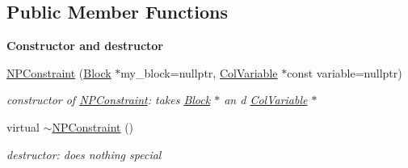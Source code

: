 \subsection*{Public Member Functions}
\begin{Indent}\textbf{ Constructor and destructor}\par
\begin{DoxyCompactItemize}
\item 
\mbox{\hyperlink{class_s_m_spp__di__unipi__it_1_1_n_p_constraint_ad3dee97dc71ec7fb7eab2dcf21b21023}{N\+P\+Constraint}} (\mbox{\hyperlink{class_s_m_spp__di__unipi__it_1_1_block}{Block}} $\ast$my\+\_\+block=nullptr, \mbox{\hyperlink{class_s_m_spp__di__unipi__it_1_1_col_variable}{Col\+Variable}} $\ast$const variable=nullptr)
\begin{DoxyCompactList}\small\item\em constructor of \mbox{\hyperlink{class_s_m_spp__di__unipi__it_1_1_n_p_constraint}{N\+P\+Constraint}}\+: takes \mbox{\hyperlink{class_s_m_spp__di__unipi__it_1_1_block}{Block}} $\ast$ an d \mbox{\hyperlink{class_s_m_spp__di__unipi__it_1_1_col_variable}{Col\+Variable}} $\ast$ \end{DoxyCompactList}\item 
\mbox{\label{class_s_m_spp__di__unipi__it_1_1_n_p_constraint_a105d3bb8f09b26a81d42c0c1a4cbbe20}} 
virtual \mbox{\hyperlink{class_s_m_spp__di__unipi__it_1_1_n_p_constraint_a105d3bb8f09b26a81d42c0c1a4cbbe20}{$\sim$\+N\+P\+Constraint}} ()
\begin{DoxyCompactList}\small\item\em destructor\+: does nothing special \end{DoxyCompactList}\end{DoxyCompactItemize}
\end{Indent}
